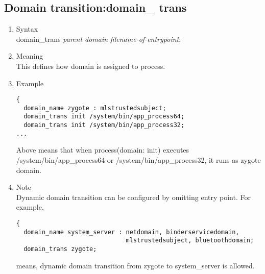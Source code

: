\documentclass{article}
\begin{document}
\subsection{Domain transition:domain\_ trans}
\begin{enumerate}
 \item Syntax\\
    domain\_trans {\it parent domain} {\it filename-of-entrypoint};
 \item Meaning\\
    This defines how domain is assigned to process. 
 \item Example\\
\begin{verbatim}
{
  domain_name zygote : mlstrustedsubject;
  domain_trans init /system/bin/app_process64;
  domain_trans init /system/bin/app_process32;
...
\end{verbatim}
    Above means that when process(domain: init) executes 
    /system/bin/app\_process64 or /system/bin/app\_process32, it runs as zygote 
    domain.
 \item Note\\
       Dynamic domain transition can be configured by omitting entry
       point. For example,
\begin{verbatim}
{
  domain_name system_server : netdomain, binderservicedomain,  
                              mlstrustedsubject, bluetoothdomain;
  domain_trans zygote;
\end{verbatim}

means, dynamic domain transition from zygote to system\_server is allowed.

\end{enumerate}
\end{document}
